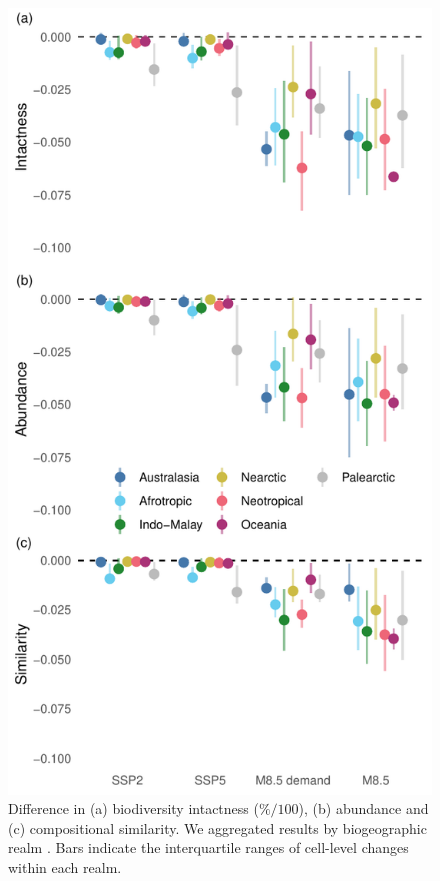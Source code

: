 \documentclass[titlesmallcaps,copyrightpage]{uomthesis}\usepackage[]{graphicx}\usepackage[]{color}
\begin{document}
\begin{figure}[htb]
  \centering
    \includegraphics{chapters/figures/chapter4/fig_biodiv.pdf}
    \caption{Difference in (a) biodiversity intactness (\(\% / 100 \)), (b) abundance and (c) compositional similarity. We aggregated results by biogeographic realm \citep[see b,][]{newbold_global_2015}. Bars indicate the interquartile ranges of cell-level changes within each realm.}
    \label{ch4:fig_biodiv}
\end{figure}
\end{document}
